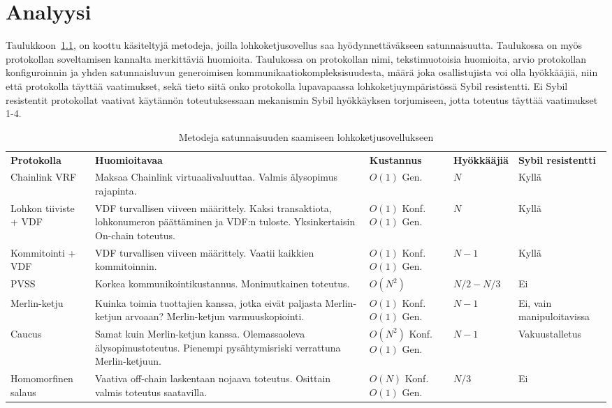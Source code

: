 \chapter{Analyysi\label{discussion}}



Taulukkoon~\ref{table:results}, on koottu käsiteltyjä metodeja, joilla lohkoketjusovellus saa hyödynnettäväkseen satunnaisuutta. Taulukossa on myös protokollan soveltamisen kannalta merkittäviä huomioita. Taulukossa on protokollan nimi, tekstimuotoisia huomioita, arvio protokollan konfiguroinnin ja yhden satunnaisluvun generoimisen kommunikaatiokompleksisuudesta, määrä joka osallistujista voi olla hyökkääjiä, niin että protokolla täyttää vaatimukset, sekä tieto siitä onko protokolla lupavapaassa lohkoketjuympäristössä Sybil resistentti. Ei Sybil resistentit protokollat vaativat käytännön toteutuksessaan mekanismin Sybil hyökkäyksen torjumiseen, jotta toteutus täyttää vaatimukset 1-4.

\begin{table}[ht]
    \caption{Metodeja satunnaisuuden saamiseen lohkoketjusovellukseen}
    \label{table:results}
    \begin{tabular}{  l  p{4cm}  p{2.5cm} p{2cm} p{4cm}}
        \toprule

\textbf{Protokolla}      
& \textbf{Huomioitavaa}
& \textbf{Kustannus}
& \textbf{Hyökkääjiä} 
& \textbf{Sybil resistentti} \\
Chainlink VRF 
& Maksaa Chainlink virtuaalivaluuttaa. Valmis älysopimus rajapinta.
& $O(1)$ Gen.
& $N$
& Kyllä  \\\hline
Lohkon tiiviste + VDF 
& VDF turvallisen viiveen määrittely. Kaksi transaktiota, lohkonumeron päättäminen ja VDF:n tuloste. Yksinkertaisin On-chain toteutus.
& $O(1)$ Konf. $O(1)$ Gen.
& $N$
& Kyllä  \\\hline
Kommitointi + VDF       
& VDF turvallisen viiveen määrittely. Vaatii kaikkien kommitoinnin.                   
&  $O(1)$ Konf. $O(1)$ Gen.
& $N-1$  
& Kyllä  \\\hline
PVSS        
& Korkea kommunikointikustannus. Monimutkainen toteutus.
& $O(N^2)$
& $N/2 - N/3$  
& Ei \\\hline
Merlin-ketju
& Kuinka toimia tuottajien kanssa, jotka eivät paljasta Merlin-ketjun arvoaan? Merlin-ketjun varmuuskopiointi.
& $O(1)$ Konf. $O(1)$ Gen. 
& $N-1$ 
& Ei, vain manipuloitavissa  \\\hline
Caucus
& Samat kuin Merlin-ketjun kanssa. Olemassaoleva älysopimustoteutus. Pienempi pysähtymisriski verrattuna Merlin-ketjuun.
& $O(N^2)$ Konf. $O(1)$ Gen. 
& $N-1$ 
& Vakuustalletus \\\hline
Homomorfinen salaus
& Vaativa off-chain laskentaan nojaava toteutus. Osittain valmis toteutus saatavilla.
& $O(N)$ Konf. $O(1)$ Gen. 
& $N/3$
& Ei  \\
        \bottomrule

    \end{tabular}
\end{table}



